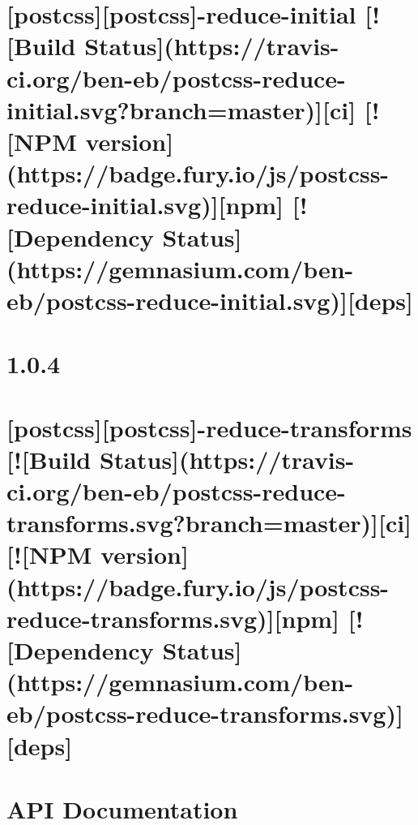\documentclass[twoside]{book}
\newcommand{\+}{\discretionary{\mbox{\scriptsize$\hookleftarrow$}}{}{}}
\begin{document}
\chapter{\mbox{[}postcss\mbox{]}\mbox{[}postcss\mbox{]}-\/reduce-\/initial \mbox{[}!\mbox{[}Build Status\mbox{]}(https\+://travis-\/ci.org/ben-\/eb/postcss-\/reduce-\/initial.svg?branch=master)\mbox{]}\mbox{[}ci\mbox{]} \mbox{[}!\mbox{[}N\+PM version\mbox{]}(https\+://badge.fury.\+io/js/postcss-\/reduce-\/initial.svg)\mbox{]}\mbox{[}npm\mbox{]} \mbox{[}!\mbox{[}Dependency Status\mbox{]}(https\+://gemnasium.com/ben-\/eb/postcss-\/reduce-\/initial.svg)\mbox{]}\mbox{[}deps\mbox{]}}
\label{md__c_1_workspace_demo_src_main_script_node_modules_postcss-reduce-initial__r_e_a_d_m_e}

\chapter{1.0.4}
\label{md__c_1_workspace_demo_src_main_script_node_modules_postcss-reduce-transforms__c_h_a_n_g_e_l_o_g}

\chapter{\mbox{[}postcss\mbox{]}\mbox{[}postcss\mbox{]}-\/reduce-\/transforms \mbox{[}!\mbox{[}Build Status\mbox{]}(https\+://travis-\/ci.org/ben-\/eb/postcss-\/reduce-\/transforms.svg?branch=master)\mbox{]}\mbox{[}ci\mbox{]} \mbox{[}!\mbox{[}N\+PM version\mbox{]}(https\+://badge.fury.\+io/js/postcss-\/reduce-\/transforms.svg)\mbox{]}\mbox{[}npm\mbox{]} \mbox{[}!\mbox{[}Dependency Status\mbox{]}(https\+://gemnasium.com/ben-\/eb/postcss-\/reduce-\/transforms.svg)\mbox{]}\mbox{[}deps\mbox{]}}
\label{md__c_1_workspace_demo_src_main_script_node_modules_postcss-reduce-transforms__r_e_a_d_m_e}

\chapter{A\+PI Documentation}
\label{md__c_1_workspace_demo_src_main_script_node_modules_postcss-selector-parser__a_p_i}

\end{document}
